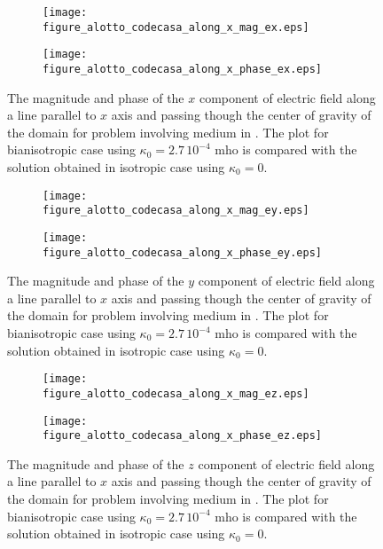 \begin{figure}
\centering
\begin{subfigure}[b]{0.49\textwidth}
\texttt{[image: figure\_alotto\_codecasa\_along\_x\_mag\_ex.eps]}
\end{subfigure}
%
\begin{subfigure}[b]{0.49\textwidth}
\centering
\texttt{[image: figure\_alotto\_codecasa\_along\_x\_phase\_ex.eps]}
\end{subfigure}
\caption{The magnitude and phase of the $x$ component of electric field along a line parallel to $x$ axis 
and passing though the center of gravity of the domain for problem involving 
medium in \cite{alottocodecasa}. 
The plot for bianisotropic case  using $\kappa_0 = 2.7\,10^{-4}$ mho is compared with 
the solution obtained in isotropic case using $\kappa_0 = 0$.}
\label{fi:alotto_codecasa_xaxis_ex}
\end{figure}

\begin{figure}
\centering
\begin{subfigure}[b]{0.49\textwidth}
\texttt{[image: figure\_alotto\_codecasa\_along\_x\_mag\_ey.eps]}
\end{subfigure}
%
\begin{subfigure}[b]{0.49\textwidth}
\centering
\texttt{[image: figure\_alotto\_codecasa\_along\_x\_phase\_ey.eps]}
\end{subfigure}
\caption{The magnitude and phase of the $y$ component of electric field along a line parallel to $x$ axis 
and passing though the center of gravity of the domain for problem involving 
medium in \cite{alottocodecasa}. 
The plot for bianisotropic case  using $\kappa_0 = 2.7\,10^{-4}$ mho is compared with 
the solution obtained in isotropic case using $\kappa_0 = 0$.}
\label{fi:alotto_codecasa_xaxis_ey}
\end{figure}

\begin{figure}
\centering
\begin{subfigure}[b]{0.49\textwidth}
\texttt{[image: figure\_alotto\_codecasa\_along\_x\_mag\_ez.eps]}
\end{subfigure}
%
\begin{subfigure}[b]{0.49\textwidth}
\centering
\texttt{[image: figure\_alotto\_codecasa\_along\_x\_phase\_ez.eps]}
\end{subfigure}
\caption{The magnitude and phase of the $z$ component of electric field along a line parallel to $x$ axis 
and passing though the center of gravity of the domain for problem involving 
medium in \cite{alottocodecasa}. 
The plot for bianisotropic case  using $\kappa_0 = 2.7\,10^{-4}$ mho is compared with 
the solution obtained in isotropic case using $\kappa_0 = 0$.}
\label{fi:alotto_codecasa_xaxis_ez}
\end{figure}

